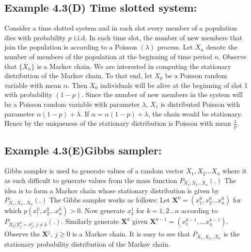 \documentclass[a4paper,10pt]{article}
\theoremstyle{plain}
\theoremstyle{definition}
\theoremstyle{remark}
\begin{document}
\subsection{Example 4.3(D) Time slotted system:}
Consider a time slotted system and in each slot every member of a population dies with probability $p$ i.i.d. In each time slot, the number of new members that join the population is according to a Poisson $(\lambda)$ process. Let $X_n$ denote the number of members of the population at the beginning of time period $n$. Observe that $\{X_n\}$ is a Markov chain. We are interested in computing the stationary distribution of the Markov chain. To that end, let $X_0 $ be a Poisson random variable with mean $\alpha$. Then $X_0$ individuals will be alive at the beginning of slot 1 with probability $(1-p)$. Since the number of new members in the system will be a Poisson random variable with parameter $\lambda$, $X_1$ is distributed Poisson with parameter $\alpha(1-p)+\lambda$. If $\alpha=\alpha(1-p)+\lambda$, the chain would be stationary. Hence by the uniqueness of the stationary distribution is Poisson with mean $\frac{\lambda}{p}$. 

\subsection{Example 4.3(E)Gibbs sampler:}
Gibbs sampler is used to generate values of a random vector $X_1,X_2 \hdots X_n$ where it as such difficult to generate values from the mass function $P_{X_1,X_2 \hdots X_n}(.)$ The idea is to form a Markov chain whose stationary distribution is given by $P_{X_1,X_2 \hdots X_n}(.)$ The Gibbs sampler works as follows: Let $\textbf{X}^0=(x_1^0,x_2^0 \hdots x_n^0)$  for which $p(x_!^0,x_2^0 \hdots x_n^0)>0$. Now generate $x_k^1$ for 
$k=1,2 \hdots n$ according to $P_{X_k|X_j^0=x_j^0,~j \neq k}(.)$. Similarly generate $\textbf{X}^k$ given 
 $\textbf{X}^{k-1}=(x_1^{k-1},\hdots x_n^{k-1})$. Observe the $\textbf{X}^j,~j \geq 0$ is a Markov chain. It is easy to see that $P_{X_1,X_2 \hdots X_n}$ is the stationary probability distribution of the Markov chain.
\end{document}
